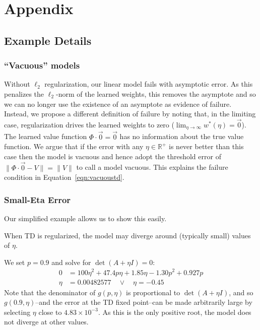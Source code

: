 
\section{Appendix}

\subsection{Example Details}

\subsubsection{``Vacuous'' models}
\label{sec:choiceoffailure}
Without $\ell_2$ regularization, our linear model fails with asymptotic error. As this penalizes the $\ell_2$-norm of the learned weights, this removes the asymptote and so we can no longer use the existence of an asymptote as evidence of failure. Instead, we propose a different definition of failure by noting that, in the limiting case, regularization drives the learned weights to zero ($\lim_{\eta\to\infty} w^*(\eta) = \vec 0$). The learned value function $\Phi\cdot\vec 0 = \vec 0$ has no information about the true value function. We argue that if the error with any $\eta\in\mathbb R^+$ is never better than this case then the model is vacuous and hence adopt the threshold error of $\|\Phi\cdot\vec 0 - V\| = \|V\|$ to call a model vacuous. This explains the failure condition in Equation~\ref{eqn:vacuoustd}.


\subsubsection{Small-Eta Error}
Our simplified example allows us to show this easily.

\begin{example}\label{ex:badeta2}
  When TD is regularized, the model may diverge around (typically small) values of $\eta$.
  \proof

  We set $p=0.9$ and solve for $\det(A+\eta I)=0$:
  \begin{align}
    0 & = 100\eta^2+47.4p\eta +1.85\eta - 1.30p^2 + 0.927p
    \\  \eta & = 0.00482577 \quad \lor \quad \eta = -0.45
  \end{align}
  Note that the denominator of $g(p,\eta)$ is proportional to $\det(A+\eta I)$, and so $g(0.9,\eta)$--and the error at the TD fixed point--can be made arbitrarily large by selecting $\eta$ close to $4.83\times 10^{-3}$. As this is the only positive root, the model does not diverge at other values.
\end{example}


